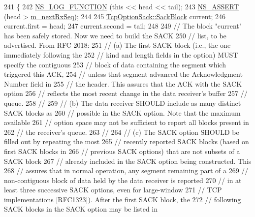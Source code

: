 \begin{DoxyCode}
241 \{
242   \hyperlink{log-macros-disabled_8h_a90b90d5bad1f39cb1b64923ea94c0761}{NS\_LOG\_FUNCTION} (\textcolor{keyword}{this} << head << tail);
243   \hyperlink{assert_8h_a6dccdb0de9b252f60088ce281c49d052}{NS\_ASSERT} (head > \hyperlink{classns3_1_1TcpRxBuffer_ab4390502dee7085dad4f7c3f9ef8796b}{m\_nextRxSeq});
244 
245   \hyperlink{classns3_1_1TcpOptionSack_a9e1d07d8729fd3ac5ead7305794675c3}{TcpOptionSack::SackBlock} current;
246   current.first = head;
247   current.second = tail;
248 
249   \textcolor{comment}{// The block "current" has been safely stored. Now we need to build the SACK}
250   \textcolor{comment}{// list, to be advertised. From RFC 2018:}
251   \textcolor{comment}{// (a) The first SACK block (i.e., the one immediately following the}
252   \textcolor{comment}{//     kind and length fields in the option) MUST specify the contiguous}
253   \textcolor{comment}{//     block of data containing the segment which triggered this ACK,}
254   \textcolor{comment}{//     unless that segment advanced the Acknowledgment Number field in}
255   \textcolor{comment}{//     the header.  This assures that the ACK with the SACK option}
256   \textcolor{comment}{//     reflects the most recent change in the data receiver's buffer}
257   \textcolor{comment}{//     queue.}
258   \textcolor{comment}{//}
259   \textcolor{comment}{// (b) The data receiver SHOULD include as many distinct SACK blocks as}
260   \textcolor{comment}{//     possible in the SACK option.  Note that the maximum available}
261   \textcolor{comment}{//     option space may not be sufficient to report all blocks present in}
262   \textcolor{comment}{//     the receiver's queue.}
263   \textcolor{comment}{//}
264   \textcolor{comment}{// (c) The SACK option SHOULD be filled out by repeating the most}
265   \textcolor{comment}{//     recently reported SACK blocks (based on first SACK blocks in}
266   \textcolor{comment}{//     previous SACK options) that are not subsets of a SACK block}
267   \textcolor{comment}{//     already included in the SACK option being constructed.  This}
268   \textcolor{comment}{//     assures that in normal operation, any segment remaining part of a}
269   \textcolor{comment}{//     non-contiguous block of data held by the data receiver is reported}
270   \textcolor{comment}{//     in at least three successive SACK options, even for large-window}
271   \textcolor{comment}{//     TCP implementations [RFC1323]).  After the first SACK block, the}
272   \textcolor{comment}{//     following SACK blocks in the SACK option may be listed in}

\end{DoxyCode}
